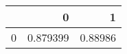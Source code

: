 \begin{tabular}{lrr}
\toprule
{} &         0 &        1 \\
\midrule
0 &  0.879399 &  0.88986 \\
\bottomrule
\end{tabular}
